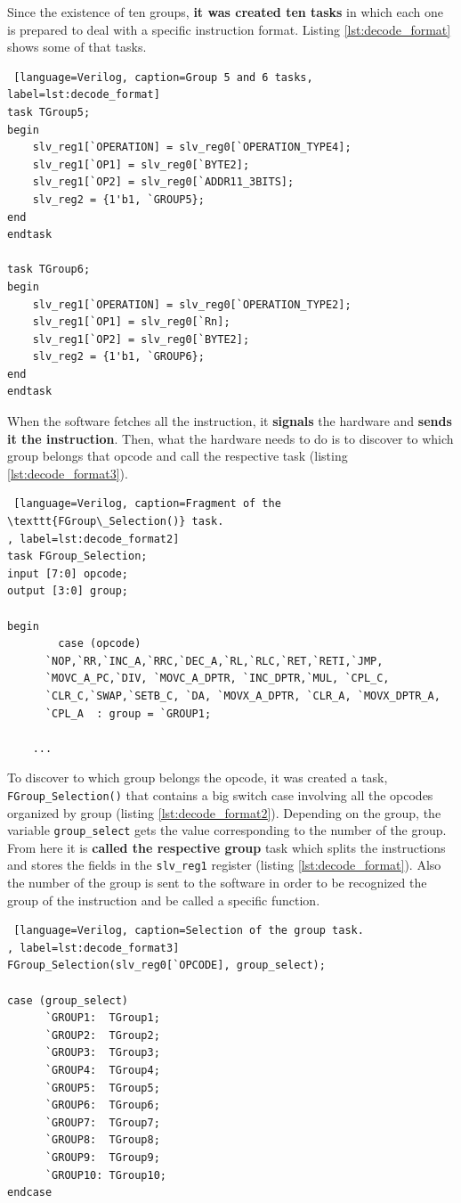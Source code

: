 Since the existence of ten groups, \textbf{it was created ten tasks} in which each one is prepared to deal with a specific instruction format. Listing \ref{lst:decode_format} shows some of that tasks.

\begin{lstlisting} [language=Verilog, caption=Group 5 and 6 tasks, label=lst:decode_format]
task TGroup5;
begin
    slv_reg1[`OPERATION] = slv_reg0[`OPERATION_TYPE4];
    slv_reg1[`OP1] = slv_reg0[`BYTE2];
    slv_reg1[`OP2] = slv_reg0[`ADDR11_3BITS];
    slv_reg2 = {1'b1, `GROUP5};
end
endtask
    
task TGroup6;
begin
    slv_reg1[`OPERATION] = slv_reg0[`OPERATION_TYPE2];
    slv_reg1[`OP1] = slv_reg0[`Rn];
    slv_reg1[`OP2] = slv_reg0[`BYTE2];
    slv_reg2 = {1'b1, `GROUP6};
end
endtask
\end{lstlisting}

When the software fetches all the instruction, it \textbf{signals} the hardware and \textbf{sends it the instruction}. Then, what the hardware needs to do is to discover to which group belongs that opcode and call the respective task (listing \ref{lst:decode_format3}). 

\begin{lstlisting} [language=Verilog, caption=Fragment of the \texttt{FGroup\_Selection()} task.
, label=lst:decode_format2]
task FGroup_Selection;
input [7:0] opcode;
output [3:0] group;
  
begin
		case (opcode)
      `NOP,`RR,`INC_A,`RRC,`DEC_A,`RL,`RLC,`RET,`RETI,`JMP, 
      `MOVC_A_PC,`DIV, `MOVC_A_DPTR, `INC_DPTR,`MUL, `CPL_C,
      `CLR_C,`SWAP,`SETB_C, `DA, `MOVX_A_DPTR, `CLR_A, `MOVX_DPTR_A,
      `CPL_A  : group = `GROUP1;
      
	...
\end{lstlisting}

To discover to which group belongs the opcode, it was created a task, \texttt{FGroup\_Selection()} that contains a big switch case involving all the opcodes organized by group (listing \ref{lst:decode_format2}). Depending on the group, the variable \texttt{group\_select} gets the value corresponding to the number of the group. From here it is \textbf{called the respective group} task which splits the instructions and stores the fields in the \texttt{slv\_reg1} register (listing \ref{lst:decode_format}). Also the number of the group is sent to the software in order to be recognized the group of the instruction and be called a specific function.



\begin{lstlisting} [language=Verilog, caption=Selection of the group task.
, label=lst:decode_format3]
FGroup_Selection(slv_reg0[`OPCODE], group_select);        
           
case (group_select)
      `GROUP1:  TGroup1;
      `GROUP2:  TGroup2;
      `GROUP3:  TGroup3;
      `GROUP4:  TGroup4;
      `GROUP5:  TGroup5;
      `GROUP6:  TGroup6;
      `GROUP7:  TGroup7;
      `GROUP8:  TGroup8;
      `GROUP9:  TGroup9;
      `GROUP10: TGroup10;          
endcase
\end{lstlisting}



